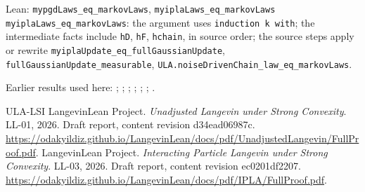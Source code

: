 \documentclass[11pt,a4paper]{article}
\begin{document}
\begin{leanbox}{Lean: \texttt{mypgdLaws\_\allowbreak{}eq\_\allowbreak{}markovLaws}, \texttt{myiplaLaws\_\allowbreak{}eq\_\allowbreak{}markovLaws}}
\texttt{myipla\allowbreak{}Laws\_\allowbreak{}eq\_\allowbreak{}markov\allowbreak{}Laws}: the argument uses \texttt{induction k with}; the intermediate facts include \texttt{h\allowbreak{}D}, \texttt{h\allowbreak{}F}, \texttt{hchain}, in source order; the source steps apply or rewrite \texttt{myipla\allowbreak{}Update\_\allowbreak{}eq\_\allowbreak{}full\allowbreak{}Gaussian\allowbreak{}Update}, \texttt{full\allowbreak{}Gaussian\allowbreak{}Update\_\allowbreak{}measurable}, \texttt{ULA.\allowbreak{}noise\allowbreak{}Driven\allowbreak{}Chain\_\allowbreak{}law\_\allowbreak{}eq\_\allowbreak{}markov\allowbreak{}Laws}.
\end{leanbox}


Earlier results used here: \cite[Section~3.20.1]{LangevinLean2026ULASC}; \cite[Section~3.33.12]{LangevinLean2026ULASC}; \cite[Section~3.33.6]{LangevinLean2026ULASC}; \cite[Section~3.41.2]{LangevinLean2026ULASC}; \cite[Section~3.41.3]{LangevinLean2026ULASC}; \cite[Section~3.1.1]{LangevinLean2026IPLA}; \cite[Section~3.3.2]{LangevinLean2026IPLA}.

\begin{thebibliography}{ULA-LSI}
LangevinLean Project. \emph{Unadjusted Langevin under Strong Convexity}. LL-01, 2026. Draft report, content revision d34ead06987c. \url{https://odakyildiz.github.io/LangevinLean/docs/pdf/UnadjustedLangevin/FullProof.pdf}.
LangevinLean Project. \emph{Interacting Particle Langevin under Strong Convexity}. LL-03, 2026. Draft report, content revision ec0201df2207. \url{https://odakyildiz.github.io/LangevinLean/docs/pdf/IPLA/FullProof.pdf}.
\end{thebibliography}
\end{document}
